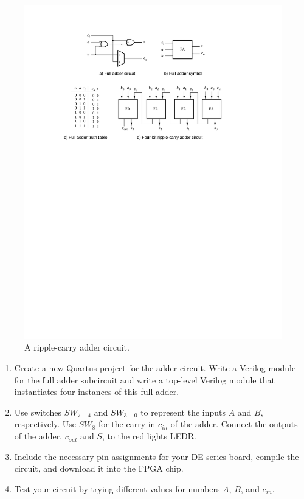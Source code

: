 \documentclass[epsfig,10pt,fullpage]{article}
\begin{document}
\begin{figure}[H]
	\begin{center}
		\includegraphics[]{figures/figure2.pdf}
	\end{center}
\caption{A ripple-carry adder circuit.}
\label{fig:fig2}
\end{figure}

\begin{enumerate}
\item Create a new Quartus project for the adder circuit. Write a Verilog module
for the full adder subcircuit and write a top-level Verilog module that instantiates four 
instances of this full adder.
\item Use switches $SW_{7-4}$ and $SW_{3-0}$ to represent the inputs $A$ and $B$, respectively.
Use $SW_{8}$ for the carry-in $c_{in}$ of the adder. Connect the outputs of the adder, 
$c_{out}$ and $S$, to the red lights LEDR.
\item Include the necessary pin assignments for your DE-series board, compile the circuit, and
download it into the FPGA chip.
\item Test your circuit by trying different values for numbers $A$, $B$, and $c_{in}$.
\end{enumerate}
\end{document}
